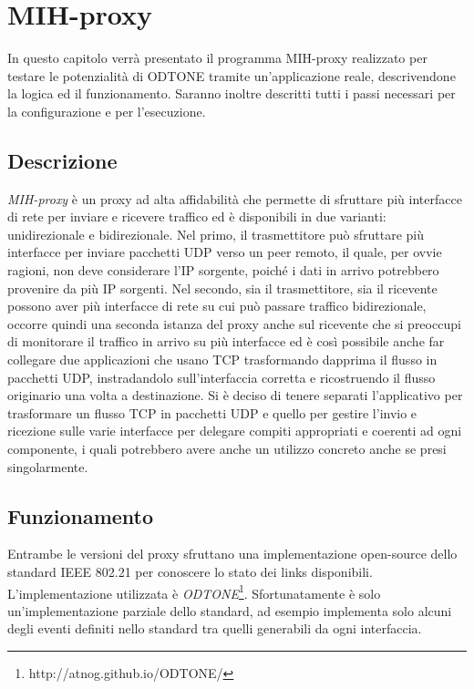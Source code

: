 \chapter{MIH-proxy}
In questo capitolo verrà presentato il programma MIH-proxy realizzato per testare le potenzialità di ODTONE tramite un'applicazione reale, descrivendone la logica ed il funzionamento. Saranno inoltre descritti tutti i passi necessari per la configurazione e per l'esecuzione.
\section{Descrizione}
{\em MIH-proxy} è un proxy ad alta affidabilità che permette di sfruttare più interfacce di rete per inviare e ricevere traffico ed è disponibili in due varianti: unidirezionale e bidirezionale. Nel primo, il trasmettitore può sfruttare più interfacce per inviare pacchetti UDP verso un peer remoto, il quale, per ovvie ragioni, non deve considerare l'IP sorgente, poiché i dati in arrivo potrebbero provenire da più IP sorgenti. Nel secondo, sia il trasmettitore, sia il ricevente possono aver più interfacce di rete su cui può passare traffico bidirezionale, occorre quindi una seconda istanza del proxy anche sul ricevente che si preoccupi di monitorare il traffico in arrivo su più interfacce ed è così possibile anche far collegare due applicazioni che usano TCP trasformando dapprima il flusso in pacchetti UDP, instradandolo sull'interfaccia corretta e ricostruendo il flusso originario una volta a destinazione. Si è deciso di tenere separati l'applicativo per trasformare un flusso TCP in pacchetti UDP e quello per gestire l'invio e ricezione sulle varie interfacce per delegare compiti appropriati e coerenti ad ogni componente, i quali potrebbero avere anche un utilizzo concreto anche se presi singolarmente.
\section{Funzionamento}
Entrambe le versioni del proxy sfruttano una implementazione open-source dello standard IEEE 802.21 per conoscere lo stato dei links disponibili. L'implementazione utilizzata è {\em ODTONE}\footnote{http://atnog.github.io/ODTONE/}. Sfortunatamente è solo un'implementazione parziale dello standard, ad esempio implementa solo alcuni degli eventi definiti nello standard tra quelli generabili da ogni interfaccia.\\

